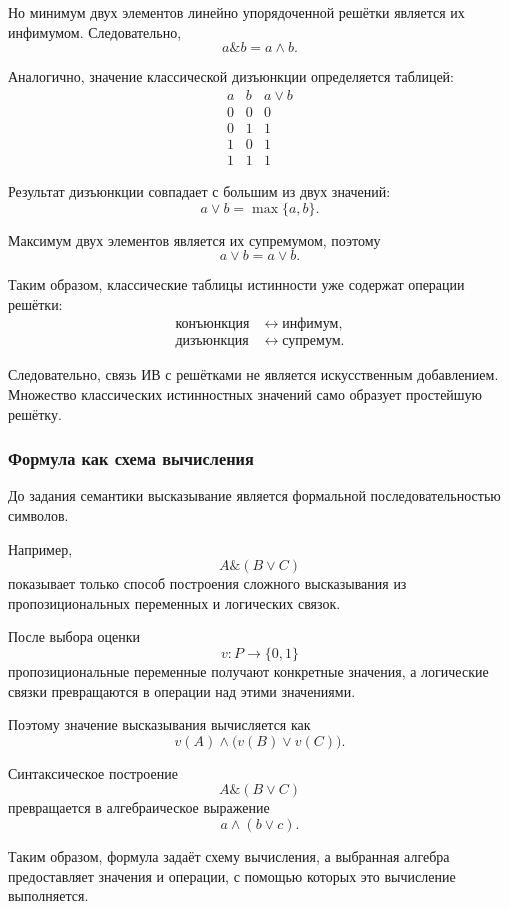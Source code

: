 \documentclass[12pt,a4paper,oneside,openany]{book}
\theoremstyle{definition}
\theoremstyle{plain}
\theoremstyle{remark}
\begin{document}
Но минимум двух элементов линейно упорядоченной решётки является их
инфимумом. Следовательно,
\[
a\mathbin{\&}b=a\wedge b.
\]

Аналогично, значение классической дизъюнкции определяется таблицей:
\[
\begin{array}{c|c|c}
a&b&a\lor b\\
\hline
0&0&0\\
0&1&1\\
1&0&1\\
1&1&1
\end{array}
\]

Результат дизъюнкции совпадает с большим из двух значений:
\[
a\lor b
=
\max\{a,b\}.
\]

Максимум двух элементов является их супремумом, поэтому
\[
a\lor b=a\vee b.
\]

Таким образом, классические таблицы истинности уже содержат операции
решётки:
\[
\boxed{
\begin{aligned}
\text{конъюнкция}
&\longleftrightarrow
\text{инфимум},\\
\text{дизъюнкция}
&\longleftrightarrow
\text{супремум}.
\end{aligned}
}
\]

Следовательно, связь ИВ с решётками не является искусственным
добавлением. Множество классических истинностных значений само
образует простейшую решётку.

\subsubsection{Формула как схема вычисления}

До задания семантики высказывание является формальной
последовательностью символов.

Например,
\[
A\mathbin{\&}(B\lor C)
\]
показывает только способ построения сложного высказывания из
пропозициональных переменных и логических связок.

После выбора оценки
\[
v:P\to\{0,1\}
\]
пропозициональные переменные получают конкретные значения, а
логические связки превращаются в операции над этими значениями.

Поэтому значение высказывания вычисляется как
\[
v(A)
\wedge
\bigl(
v(B)\vee v(C)
\bigr).
\]

Синтаксическое построение
\[
A\mathbin{\&}(B\lor C)
\]
превращается в алгебраическое выражение
\[
a\wedge(b\vee c).
\]

Таким образом, формула задаёт схему вычисления, а выбранная алгебра
предоставляет значения и операции, с помощью которых это вычисление
выполняется.
\end{document}

